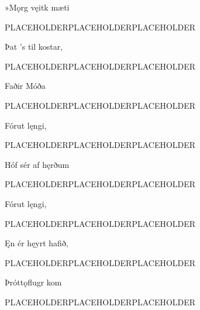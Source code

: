 \bvg
\bva »Mǫrg vęitk mæti\eva

\bvb PLACEHOLDERPLACEHOLDERPLACEHOLDER\evb
\evg


\bvg
\bva Þat ’s til kostar,\eva

\bvb PLACEHOLDERPLACEHOLDERPLACEHOLDER\evb
\evg


\bvg
\bva Faðir Móða\eva

\bvb PLACEHOLDERPLACEHOLDERPLACEHOLDER\evb
\evg


\bvg
\bva Fórut lęngi,\eva

\bvb PLACEHOLDERPLACEHOLDERPLACEHOLDER\evb
\evg


\bvg
\bva Hóf sér af hęrðum\eva

\bvb PLACEHOLDERPLACEHOLDERPLACEHOLDER\evb
\evg


\bvg
\bva Fórut lęngi,\eva

\bvb PLACEHOLDERPLACEHOLDERPLACEHOLDER\evb
\evg


\bvg
\bva Ęn ér hęyrt hafið,\eva

\bvb PLACEHOLDERPLACEHOLDERPLACEHOLDER\evb
\evg


\bvg
\bva Þróttǫflugr kom\eva

\bvb PLACEHOLDERPLACEHOLDERPLACEHOLDER\evb
\evg
